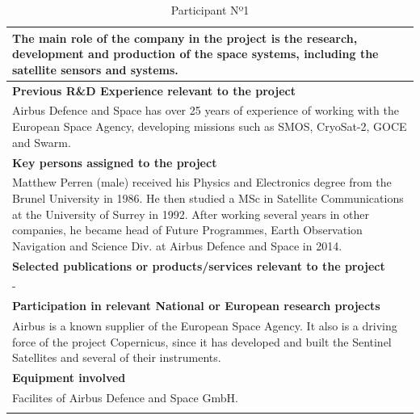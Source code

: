 \begin{longtable}[H]{|p{0.7cm}|p{4cm}|p{7cm}|p{1.3cm}|}
	\multicolumn{4}{|p{14.5cm}|}{The main role of the company in the project is the research, development and production of the space systems, including the satellite sensors and systems.}  \\ \hline
	
	\multicolumn{4}{|p{14.5cm}|}{\textbf{Previous R\&D Experience relevant to the project}}  \\ \hline
	
	\multicolumn{4}{|p{13cm}|}{Airbus Defence and Space has over 25 years of experience of working with the European Space Agency, developing missions such as SMOS, CryoSat-2, GOCE and Swarm.}  \\ \hline
	
	\multicolumn{4}{|p{13cm}|}{\textbf{Key persons assigned to the project}}   \\ \hline
	
	
	\multicolumn{4}{|p{14.5cm}|}{Matthew Perren (male) received his Physics and Electronics degree from the Brunel University in 1986. He then studied a MSc in Satellite Communications at the University of Surrey in 1992. After working several years in other companies, he became head of Future Programmes, Earth Observation Navigation and Science Div. at Airbus Defence and Space in 2014.}  \\ \hline
	
	\multicolumn{4}{|p{13cm}|}{\textbf{Selected publications or products/services relevant to the project}}  \\ \hline
	
	\multicolumn{4}{|p{14.5cm}|}{-}  \\ \hline
	
	\multicolumn{4}{|p{13cm}|}{\textbf{Participation in relevant National or European research projects}}  \\ \hline
	
	\multicolumn{4}{|p{14.5cm}|}{Airbus is a known supplier of the European Space Agency. It also is a driving force of the project Copernicus, since it has developed and built the Sentinel Satellites and several of their instruments.}  \\ \hline
	
	\multicolumn{4}{|p{13cm}|}{\textbf{Equipment involved}}  \\ \hline
	
	\multicolumn{4}{|p{14.5cm}|}{Facilites of Airbus Defence and Space GmbH.}  \\ \hline
	\caption{Participant Nº1}
\end{longtable}



